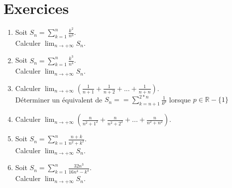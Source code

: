 \documentclass[a4paper,11pt]{book}
\begin{document}
\section{Exercices}
\begin{enumerate} 
\item
Soit $\displaystyle S_n=\sum_{k=1}^n \frac{k^2}{n^3}$.\\
Calculer $\displaystyle \lim_{n \rightarrow +\infty} S_n$.
\item
Soit $\displaystyle S_n=\sum_{k=1}^n \frac{k^3}{n^4}$.\\
Calculer $\displaystyle \lim_{n \rightarrow +\infty} S_n$.
\item
Calculer 
$\displaystyle \lim_{n \rightarrow +\infty}(\frac{1}{n+1}+\frac{1}{n+2}+...+\frac{1}{n+n})$.\\
D\'eterminer un \'equivalent de $S_n==\sum_{k=n+1}^{2*n} \frac{1}{k^p}$ lorsque $p\in  \mathbb R-\{1\}$
\item
Calculer 
$\displaystyle \lim_{n \rightarrow +\infty}(\frac{n}{n^2+1^2}+\frac{n}{n^2+2^2}+...+\frac{n}{n^2+n^2})$.
\item
Soit $\displaystyle S_n=\sum_{k=1}^n \frac{n+k}{n^2+k^2}$.\\
Calculer $\displaystyle \lim_{n \rightarrow +\infty} S_n$.
\item
Soit $\displaystyle S_n=\sum_{k=1}^n \frac{32n^3}{16n^4-k^4}$.\\
Calculer $\displaystyle \lim_{n \rightarrow +\infty} S_n$.
\end{enumerate}
\end{document}
